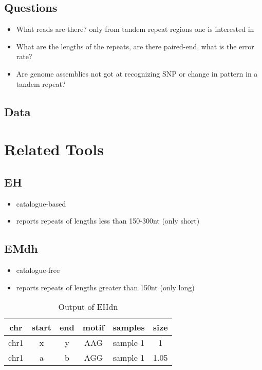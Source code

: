 \subsection{Questions}
\begin{itemize}
    \item What reads are there? only from tandem repeat regions one is interested in
    \item What are the lengths of the repeats, are there paired-end, what is the error rate?
    \item Are genome assemblies not got at recognizing SNP or change in pattern in a tandem repeat?
\end{itemize}


\subsection{Data}


\section{Related Tools}

\subsection{EH}
\cite{EH}
\begin{itemize}
    \item catalogue-based
    \item reports repeats of lengths less than 150-300nt (only short)
\end{itemize}

\subsection{EMdh}
\cite{EHdn}
\begin{itemize}
    \item catalogue-free
    \item reports repeats of lengths greater than 150nt (only long)
\end{itemize}
\begin{table}[h]
    \caption{Output of EHdn}
    \center
    \begin{tabular}{c|c|c|c|c|c}
        chr  & start & end & motif & samples  & size \\\hline
        chr1 & x     & y   & AAG   & sample 1 & 1    \\
        chr1 & a     & b   & AGG   & sample 1 & 1.05
    \end{tabular}
\end{table}

